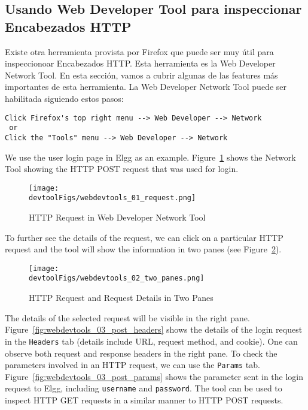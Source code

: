 \subsection{Usando Web Developer Tool para inspeccionar Encabezados HTTP}
\label{web:sec:web_dev_tools}

Existe otra herramienta provista por Firefox que puede ser muy útil para inspeccionoar Encabezados HTTP.
Esta herramienta es la Web Developer Network Tool. En esta sección, vamos a cubrir algunas de las features más importantes de esta herramienta.
La Web Developer Network Tool puede ser habilitada siguiendo estos pasos:

\begin{lstlisting}
Click Firefox's top right menu --> Web Developer --> Network
 or 
Click the "Tools" menu --> Web Developer --> Network 
\end{lstlisting}


We use the user login page in Elgg as an example. 
Figure~\ref{fig:webdevtools_01_request} shows the Network Tool showing the HTTP POST request
that was used for login.

\begin{figure}[htb]
\begin{center}
\texttt{[image: \\devtoolFigs/webdevtools\_01\_request.png]}
\end{center}
\caption{HTTP Request in Web Developer Network Tool}
\label{fig:webdevtools_01_request}
\end{figure}

To further see the details of the request, we can click on a particular HTTP request and the
tool will show the information in two panes (see Figure~\ref{fig:webdevtools_02_two_panes}). 

\begin{figure}[htb]
\begin{center}
	\texttt{[image: \\devtoolFigs/webdevtools\_02\_two\_panes.png]}
\end{center}
\caption{HTTP Request and Request Details in Two Panes}
\label{fig:webdevtools_02_two_panes}
\end{figure}



The details of the selected request will be visible in the right pane.
Figure~\ref{fig:webdevtools_03_post_headers} shows the details of the login request in the
\texttt{Headers} tab (details include URL, request method, and cookie). One can observe both
request and response headers in the right pane. To check the parameters involved in an HTTP
request, we can use the \texttt{Params} tab. Figure~\ref{fig:webdevtools_03_post_params} shows
the parameter sent in the login request to Elgg, including \texttt{username} and
\texttt{password}. The tool can be used to inspect HTTP GET requests in a similar manner to HTTP POST requests.

